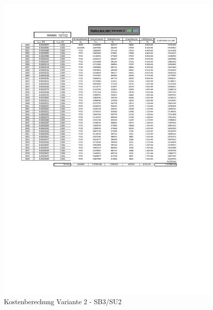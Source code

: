 \begin{figure}[h!]
	\centering
	\includegraphics[width=\textwidth]{figures/Anhang/f-00-A-V2-B3-U2}
	\caption{Kostenberechung Variante 2 - SB3/SU2}
\end{figure}

